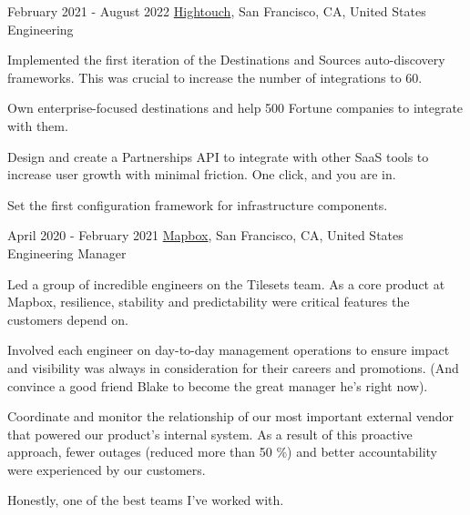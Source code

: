 \experience
  {February 2021 - August 2022}
  {\href{https://hightouch.com}{Hightouch}, San Francisco, CA, United States}
  {Engineering}
  {\vspace{-1em}\begin{rlist}
    \item Implemented the first iteration of the Destinations and Sources auto-discovery
    frameworks. This was crucial to increase the number of integrations to 60.
    \item Own enterprise-focused destinations and help 500 Fortune companies to integrate with them.
    \item Design and create a Partnerships API to integrate with other SaaS tools to
    increase user growth with minimal friction. One click, and you are in.
    \item Set the first configuration framework for infrastructure components.
  \end{rlist}}

\experience
  {April 2020 - February 2021}
  {\href{https://mapbox.com}{Mapbox}, San Francisco, CA, United States}
  {Engineering Manager}
  {\vspace{-1em}\begin{rlist}
    \item Led a group of incredible engineers on the Tilesets team. As a core product
    at Mapbox, resilience, stability and predictability were critical features the customers depend on.
    \item Involved each engineer on day-to-day management operations to ensure impact
    and visibility was always in consideration for their careers and promotions. (And convince
    a good friend Blake to become the great manager he's right now).
    \item Coordinate and monitor the relationship of our most important external vendor that
    powered our product's internal system. As a result of this proactive approach, fewer
    outages (reduced more than 50 \%) and better accountability were experienced by our customers.
    \item Honestly, one of the best teams I’ve worked with.
  \end{rlist}}



